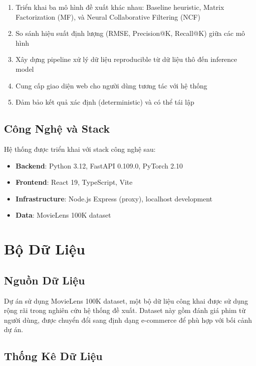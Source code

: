 \documentclass[12pt,a4paper]{article}
\begin{document}
\begin{enumerate}
    \item Triển khai ba mô hình đề xuất khác nhau: Baseline heuristic, Matrix Factorization (MF), và Neural Collaborative Filtering (NCF)
    \item So sánh hiệu suất định lượng (RMSE, Precision@K, Recall@K) giữa các mô hình
    \item Xây dựng pipeline xử lý dữ liệu reproducible từ dữ liệu thô đến inference model
    \item Cung cấp giao diện web cho người dùng tương tác với hệ thống
    \item Đảm bảo kết quả xác định (deterministic) và có thể tái lập
\end{enumerate}

\subsection{Công Nghệ và Stack}

Hệ thống được triển khai với stack công nghệ sau:
\begin{itemize}
    \item \textbf{Backend}: Python 3.12, FastAPI 0.109.0, PyTorch 2.10
    \item \textbf{Frontend}: React 19, TypeScript, Vite
    \item \textbf{Infrastructure}: Node.js Express (proxy), localhost development
    \item \textbf{Data}: MovieLens 100K dataset
\end{itemize}

\section{Bộ Dữ Liệu}

\subsection{Nguồn Dữ Liệu}

Dự án sử dụng MovieLens 100K dataset, một bộ dữ liệu công khai được sử dụng rộng rãi trong nghiên cứu hệ thống đề xuất. Dataset này gồm đánh giá phim từ người dùng, được chuyển đổi sang định dạng e-commerce để phù hợp với bối cảnh dự án.

\subsection{Thống Kê Dữ Liệu}
\end{document}

